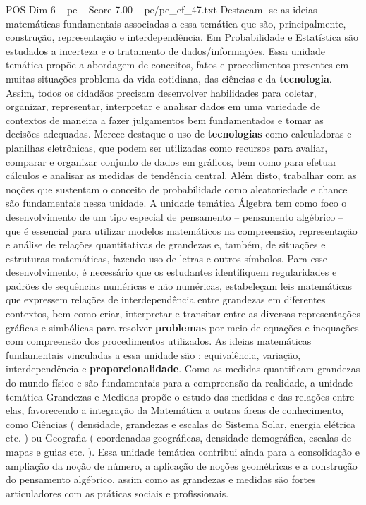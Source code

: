 \begin{textsample}{POS Dim 6 – pe – Score 7.00 – pe/pe\_ef\_47.txt}
Destacam -se as ideias matemáticas fundamentais associadas a essa temática que são, principalmente, construção, representação e interdependência.
Em Probabilidade e Estatística são estudados a incerteza e o tratamento de dados/informações.
Essa unidade temática propõe a abordagem de conceitos, fatos e procedimentos presentes em muitas situações-problema da vida cotidiana, das ciências e da \textbf{tecnologia}.
Assim, todos os cidadãos precisam desenvolver habilidades para coletar, organizar, representar, interpretar e analisar dados em uma variedade de contextos de maneira a fazer julgamentos bem fundamentados e tomar as decisões adequadas.
Merece destaque o uso de \textbf{tecnologias} como calculadoras e planilhas eletrônicas, que podem ser utilizadas como recursos para avaliar, comparar e organizar conjunto de dados em gráficos, bem como para efetuar cálculos e analisar as medidas de tendência central.
Além disto, trabalhar com as noções que sustentam o conceito de probabilidade como aleatoriedade e chance são fundamentais nessa unidade.
A unidade temática Álgebra tem como foco o desenvolvimento de um tipo especial de pensamento – pensamento algébrico – que é essencial para utilizar modelos matemáticos na compreensão, representação e análise de relações quantitativas de grandezas e, também, de situações e estruturas matemáticas, fazendo uso de letras e outros símbolos.
Para esse desenvolvimento, é necessário que os estudantes identifiquem regularidades e padrões de sequências numéricas e não numéricas, estabeleçam leis matemáticas que expressem relações de interdependência entre grandezas em diferentes contextos, bem como criar, interpretar e transitar entre as diversas representações gráficas e simbólicas para resolver \textbf{problemas} por meio de equações e inequações com compreensão dos procedimentos utilizados.
As ideias matemáticas fundamentais vinculadas a essa unidade são : equivalência, variação, interdependência e \textbf{proporcionalidade}.
Como as medidas quantificam grandezas do mundo físico e são fundamentais para a compreensão da realidade, a unidade temática Grandezas e Medidas propõe o estudo das medidas e das relações entre elas, favorecendo a integração da Matemática a outras áreas de conhecimento, como Ciências ( densidade, grandezas e escalas do Sistema Solar, energia elétrica etc. ) ou Geografia ( coordenadas geográficas, densidade demográfica, escalas de mapas e guias etc. ).
Essa unidade temática contribui ainda para a consolidação e ampliação da noção de número, a aplicação de noções geométricas e a construção do pensamento algébrico, assim como as grandezas e medidas são fortes articuladores com as práticas sociais e profissionais.

\end{textsample}
